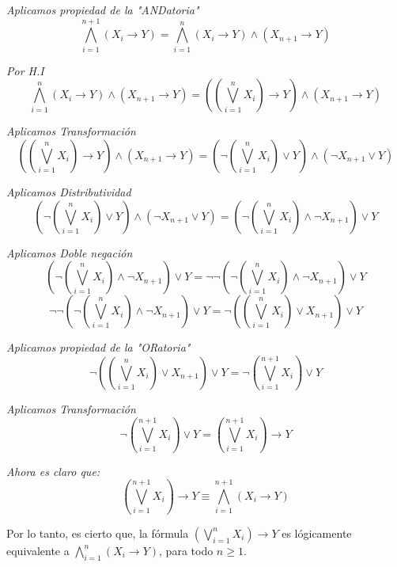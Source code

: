 \documentclass[../doc.tex]{subfiles}
\begin{document}
\emph{Aplicamos propiedad de la "ANDatoria"}
\[ \bigwedge _{i=1}^{n+1} (X_i \rightarrow Y) = \bigwedge _{i=1}^{n} (X_i \rightarrow Y) \land (X_{n+1} \rightarrow Y) \]

\emph{Por H.I}
\[ \bigwedge _{i=1}^{n} (X_i \rightarrow Y) \land (X_{n+1} \rightarrow Y) = ((\bigvee _{i=1}^{n} X_i) \rightarrow Y) \land (X_{n+1} \rightarrow Y) \] 

\emph{Aplicamos Transformación}
\[ ((\bigvee _{i=1}^{n} X_i) \rightarrow Y) \land (X_{n+1} \rightarrow Y) = (\neg(\bigvee _{i=1}^{n} X_i) \lor Y) \land (\neg X_{n+1} \lor Y) \]

\emph{Aplicamos Distributividad}
\[ (\neg(\bigvee _{i=1}^{n} X_i) \lor Y) \land (\neg X_{n+1} \lor Y) = (\neg(\bigvee _{i=1}^{n} X_i) \land \neg X_{n+1} ) \lor Y\]

\emph{Aplicamos Doble negación}
\[ (\neg(\bigvee _{i=1}^{n} X_i) \land \neg X_{n+1} ) \lor Y = \neg\neg(\neg(\bigvee _{i=1}^{n} X_i) \land \neg X_{n+1} ) \lor Y\] 
\[ \neg\neg(\neg(\bigvee _{i=1}^{n} X_i) \land \neg X_{n+1} ) \lor Y = \neg((\bigvee _{i=1}^{n} X_i) \lor  X_{n+1} )\lor Y \]

\emph{Aplicamos propiedad de la "ORatoria"}
\[ \neg((\bigvee _{i=1}^{n} X_i) \lor  X_{n+1}) \lor Y = \neg(\bigvee _{i=1}^{n+1} X_i) \lor Y \]

\emph{Aplicamos Transformación}
\[ \neg(\bigvee _{i=1}^{n+1} X_i) \lor Y = (\bigvee _{i=1}^{n+1} X_i) \rightarrow Y\]

\emph{Ahora es claro que:}
\[ (\bigvee _{i=1}^{n+1} X_i) \rightarrow Y \equiv \bigwedge _{i=1}^{n+1} (X_i \rightarrow Y) \]

Por lo tanto, es cierto que, la fórmula $(\bigvee _{i=1}^{n} X_i) \rightarrow Y $ es lógicamente equivalente a $\bigwedge _{i=1}^{n} (X_i \rightarrow Y)$, para todo $n \ge 1$.
\end{document}
